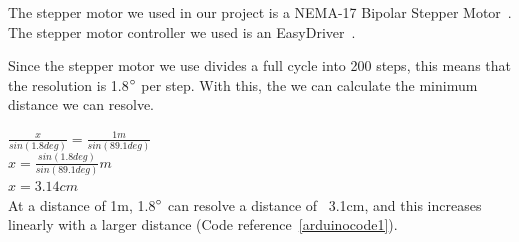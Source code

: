 The stepper motor we used in our project is a NEMA-17 Bipolar Stepper Motor~\cite{steppermotor}.
The stepper motor controller we used is an EasyDriver~\cite{steppercontroller}.



Since the stepper motor we use divides a full cycle into 200 steps, this means that the resolution is 1.8$\degree$ per step. With this, the we can calculate the minimum distance we can resolve. %

$\frac{x}{sin(1.8deg)} = \frac{1m}{sin(89.1deg)}$ \\
$x = \frac{sin(1.8deg)}{sin(89.1deg)}m$ \\
$x = 3.14cm$ \\

At a distance of 1m, 1.8$\degree$ can resolve a distance of ~3.1cm, and this increases linearly with a larger distance (Code reference~\ref{arduinocode1}).
